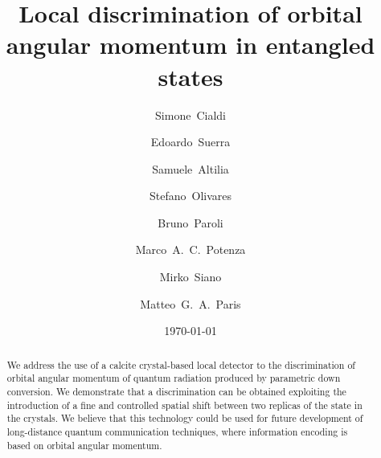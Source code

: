 \documentclass[
reprint,
amsmath,amssymb,
aps,
showkeys
]{revtex4-2}
\begin{document}

\title{Local discrimination of orbital angular momentum in entangled states
}

\author{Simone~Cialdi}

\author{Edoardo~Suerra}

\author{Samuele~Altilia}

\author{Stefano~Olivares}

\author{Bruno~Paroli}

\author{Marco~A.~C.~Potenza}

\author{Mirko~Siano}

\author{Matteo~G.~A.~Paris}

\date{\today}%

\begin{abstract}
We address the use of a calcite crystal-based local detector to the discrimination of orbital angular momentum of quantum radiation produced by parametric down conversion.
We demonstrate that a discrimination can be obtained exploiting the introduction of a fine and controlled spatial shift between two replicas of the state in the crystals.
We believe that this technology could be used for future development of long-distance quantum communication techniques, where information encoding is based on orbital angular momentum.
\end{abstract}

\end{document}
